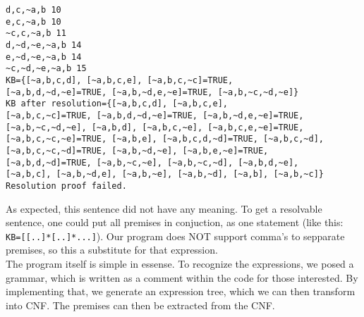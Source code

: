 \documentclass{report}
\begin{document}
\begin{itemize}
\begin{verbatim}
d,c,~a,b 10
e,c,~a,b 10
~c,c,~a,b 11
d,~d,~e,~a,b 14
e,~d,~e,~a,b 14
~c,~d,~e,~a,b 15
KB={[~a,b,c,d], [~a,b,c,e], [~a,b,c,~c]=TRUE, 
[~a,b,d,~d,~e]=TRUE, [~a,b,~d,e,~e]=TRUE, [~a,b,~c,~d,~e]}
KB after resolution={[~a,b,c,d], [~a,b,c,e], 
[~a,b,c,~c]=TRUE, [~a,b,d,~d,~e]=TRUE, [~a,b,~d,e,~e]=TRUE, 
[~a,b,~c,~d,~e], [~a,b,d], [~a,b,c,~e], [~a,b,c,e,~e]=TRUE, 
[~a,b,c,~c,~e]=TRUE, [~a,b,e], [~a,b,c,d,~d]=TRUE, [~a,b,c,~d], 
[~a,b,c,~c,~d]=TRUE, [~a,b,~d,~e], [~a,b,e,~e]=TRUE, 
[~a,b,d,~d]=TRUE, [~a,b,~c,~e], [~a,b,~c,~d], [~a,b,d,~e], 
[~a,b,c], [~a,b,~d,e], [~a,b,~e], [~a,b,~d], [~a,b], [~a,b,~c]}
Resolution proof failed.
    \end{verbatim}
    As expected, this sentence did not have any meaning. To get a resolvable sentence, one could put all premises in conjuction, as one statement (like this: \verb|KB=[[..]*[..]*...]|). Our program does NOT support comma's to sepparate premises, so this a substitute for that expression.\\
    The program itself is simple in essense. To recognize the expressions, we posed a grammar, which is written as a comment within the code for those interested. By implementing that, we generate an expression tree, which we can then transform into CNF. The premises can then be extracted from the CNF. 
\end{itemize}
\end{document}
